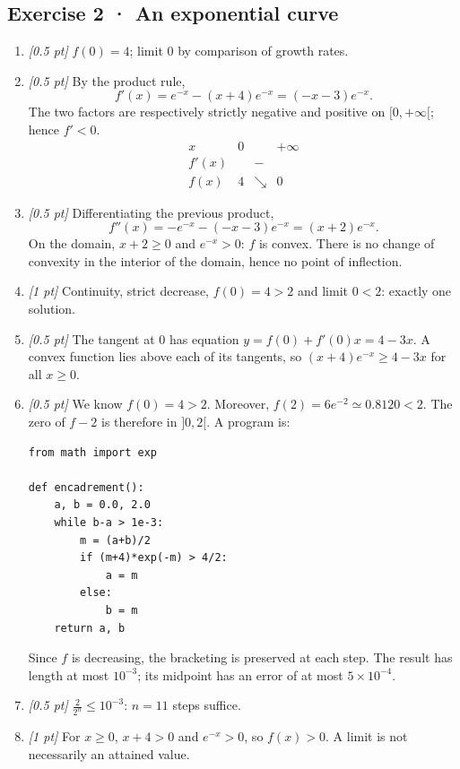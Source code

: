 \subsection*{Exercise 2 · An exponential curve}\begin{enumerate}

\item \textit{[0.5 pt]} $f(0)=4$; limit $0$ by comparison of growth rates.

\item \textit{[0.5 pt]} By the product rule,
\[f'(x)=e^{-x}-(x+4)e^{-x}=(-x-3)e^{-x}.\]
The two factors are respectively strictly negative and positive on $[0,+\infty[$; hence $f'<0$.
\[\begin{array}{c|ccc}x&0&&+\infty\\\hline f'(x)&&-&\\\hline f(x)&4&\searrow&0\end{array}\]

\item \textit{[0.5 pt]} Differentiating the previous product,
\[f''(x)=-e^{-x}-(-x-3)e^{-x}=(x+2)e^{-x}.\]
On the domain, $x+2\ge0$ and $e^{-x}>0$: $f$ is convex. There is no change of convexity in the interior of the domain, hence no point of inflection.

\item \textit{[1 pt]} Continuity, strict decrease, $f(0)=4>2$ and limit $0<2$: exactly one solution.

\item \textit{[0.5 pt]} The tangent at $0$ has equation $y=f(0)+f'(0)x=4-3x$. A convex function lies above each of its tangents, so $(x+4)e^{-x}\ge 4-3x$ for all $x\ge0$.


\item \textit{[0.5 pt]} We know $f(0)=4>2$. Moreover, $f(2)=6e^{-2}\simeq0.8120<2$. The zero of $f-2$ is therefore in $]0,2[$. A program is:
\begin{lstlisting}
from math import exp

def encadrement():
    a, b = 0.0, 2.0
    while b-a > 1e-3:
        m = (a+b)/2
        if (m+4)*exp(-m) > 4/2:
            a = m
        else:
            b = m
    return a, b
\end{lstlisting}
Since $f$ is decreasing, the bracketing is preserved at each step. The result has length at most $10^{-3}$; its midpoint has an error of at most $5\times10^{-4}$.

\item \textit{[0.5 pt]} $\frac{2}{2^n}\le10^{-3}$: $n=11$ steps suffice.

\item \textit{[1 pt]} For $x\ge0$, $x+4>0$ and $e^{-x}>0$, so $f(x)>0$. A limit is not necessarily an attained value.

\end{enumerate}

